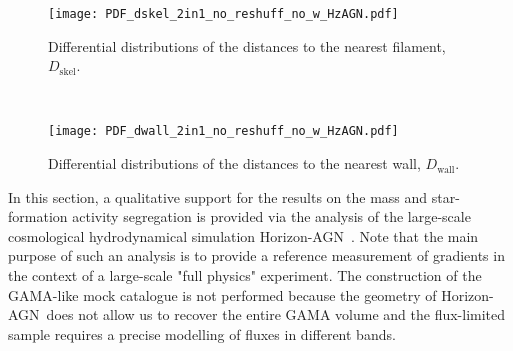 \documentclass[useAMS,usenatbib]{mnras}
\newcommand{\Mstardot}{M\ensuremath{_{\star}} / \mathrm{M}\ensuremath{_{\odot}}}
\newcommand{\ssfr}{$\mbox{sSFR}$\xspace}
\newcommand{\hagn}{\mbox{{\sc \small Horizon-AGN}}}
\begin{document}
\begin{figure*}
    \centering
    \begin{subfigure}{\textwidth}
        \centering
        \texttt{[image: PDF\_dskel\_2in1\_no\_reshuff\_no\_w\_HzAGN.pdf]}
        \caption{Differential distributions of the distances to the nearest filament, $D_{\mathrm{skel}}$.}
    \end{subfigure}%
    \\
    \begin{subfigure}{\textwidth}
        \centering
        \texttt{[image: PDF\_dwall\_2in1\_no\_reshuff\_no\_w\_HzAGN.pdf]}
        \caption{Differential distributions of the distances to the nearest wall, $D_{\mathrm{wall}}$.}
    \end{subfigure}
    \caption{\textit{Top rows:} Differential distributions of the distances as a function of stellar mass (left panels) and \ssfr (right panels) for galaxies in \hagn. 
To minimise the contribution of nodes and filaments to the measured signal, galaxies located closer to a node than 3.5 Mpc and closer to a filament than 1 Mpc are removed form the analysis. The vertical lines indicate the medians of the distributions (see Table~\ref{tab:medians_dskel_dwall_HzAGN} for the numerical values). Numbers of galaxies in different considered bins are indicated in each panel. 
There is mass and \ssfr segregation of galaxies with respect to both filaments and walls: more massive and less star-forming galaxies tend to be preferentially located closer to the cores of filaments and walls compared to their lower-mass and more star-forming counterparts, respectively. These results are in qualitative agreement with the measurements in GAMA.
 \textit{Bottom rows:} Residuals in units of $\sigma$ between the two most extreme mass and \ssfr bins, $\log(\Mstardot) \geq 10.8$ and $10.4 > \log (\Mstardot) \geq 10$ on the left 
and $-10.8 > \log (\ssfr/\mathrm{yr}^{-1})$ and $\log(\ssfr/\mathrm{yr}^{-1}) \geq -10.4$ on the right panels, respectively.
 }
    \label{Fig:PDF_dskel_dwall_HzAGN}
\end{figure*}

 
In this section, a qualitative support for the results on the mass and star-formation activity segregation is provided via the analysis of the large-scale cosmological hydrodynamical simulation \hagn~\citep{Dubois2014}. 
Note that the main purpose of such an analysis is to provide a reference measurement of gradients in the context of a large-scale "full physics" experiment.      
The construction of the GAMA-like mock catalogue is not performed because the geometry of \hagn\, does not allow us to recover the entire GAMA volume 
and the flux-limited sample requires a precise modelling of fluxes in different bands.   
 
\end{document}

